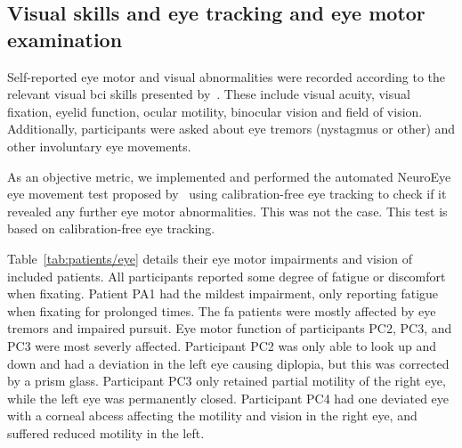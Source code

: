 \subsection{Visual skills and eye tracking and eye motor examination}

Self-reported eye motor and visual abnormalities were recorded according to the
relevant visual \ac{bci} skills presented by~\textcite{FriedOken2020}.
These include visual acuity, visual fixation, eyelid function, ocular motility,
binocular vision and field of vision.
Additionally, participants were asked about eye tremors (nystagmus or other) and
other involuntary eye movements.

As an objective metric, we implemented and performed the automated NeuroEye eye movement
test proposed by~\textcite{Hassan2022} using calibration-free eye tracking to
check if it revealed any further eye motor abnormalities.
This was not the case.
This test is based on calibration-free eye tracking.

Table~\ref{tab:patients/eye} details their eye motor impairments and vision of
included patients.
All participants reported some degree of fatigue or discomfort when fixating.
Patient PA1 had the mildest impairment, only reporting fatigue when fixating
for prolonged times.
The \ac{fa} patients were mostly affected by eye tremors and impaired pursuit.
Eye motor function of participants PC2, PC3, and PC3 were most severly affected.
Participant PC2 was only able to look up and down and had a deviation in the
left eye causing diplopia, but this was corrected by a prism glass.
Participant PC3 only retained partial motility of the right eye, while the left eye was permanently closed.
Participant PC4 had one deviated eye with a corneal abcess affecting the motility
and vision in the right eye, and suffered reduced motility in the left.

\begin{table}[t]
  \centering
  \footnotesize
  
  \caption[Visual skills of the included participants.]{%
  Visual skills of the included participants.
  Visual~\ac{bci} skills~\cite{FriedOken2020}
  was assessed with a combination of self-reported issues
  by the subject and the NeuroEye~\cite{Hassan2022} test. \BigCross\
  impaired, \BigDiamondshape\ severely impaired. Visual acuity in logMAR, lower
  is better.}
  \label{tab:patients/eye}
\end{table}

